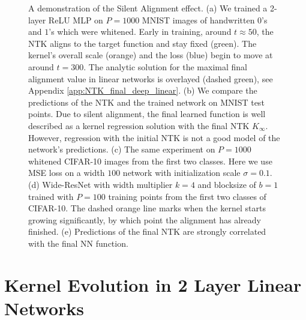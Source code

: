 \documentclass{article} %
\begin{document}
\begin{figure}[t]
    \centering
    \caption{A demonstration of the Silent Alignment effect. (a) We trained a 2-layer ReLU MLP on $P = 1000$ MNIST images of handwritten $0$'s and $1$'s which were whitened. Early in training, around $t \approx 50$, the NTK aligns to the target function and stay fixed (green). The kernel's overall scale (orange) and the loss (blue) begin to move at around $t=300$. The analytic solution for the maximal final alignment value in linear networks is overlayed (dashed green), see Appendix \ref{app:NTK_final_deep_linear}. (b)  We compare the predictions of the NTK and the trained network on MNIST test points. Due to silent alignment, the final learned function is well described as a kernel regression solution with the final NTK $K_{\infty}$. However, regression with the initial NTK is not a good model of the network's predictions. (c) The same experiment on $P =1000$ whitened CIFAR-10 images from the first two classes. Here we use MSE loss on a width $100$ network with initialization scale $\sigma=0.1$. (d) Wide-ResNet with width multiplier $k=4$ and blocksize of $b=1$ trained with $P=100$ training points from the first two classes of CIFAR-10. The dashed orange line marks when the kernel starts growing significantly, by which point the alignment has already finished. (e) Predictions of the final NTK are strongly correlated with the final NN function.  }
    \label{fig:relu_demo_silent_alignment}
\end{figure}

 
\section{Kernel Evolution in 2 Layer Linear Networks}\label{sec:two_layer_linear}
\end{document}
